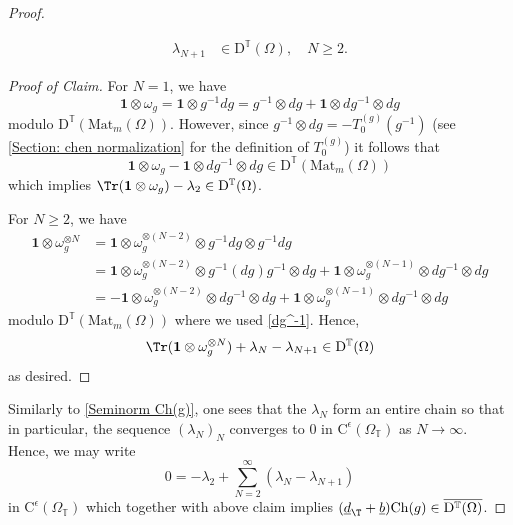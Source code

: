 \documentclass[a4paper, english, 12pt, bibliography=totocnumbered,
index=totoc]{scrartcl}
\begin{document}
\begin{proof}
\begin{claim}
\begin{align*}
			\lambda_{N+1} & \in
			\mathrm{D}^{\mathbb{T}}(\Omega), \quad N \geq 2.
		\end{align*}
	\end{claim}
	\begin{proof}[Proof of Claim]
		For $N = 1$, we have
		\begin{equation*}
			\mathbf{1} \otimes \omega_g = \mathbf{1} \otimes g^{-1}dg =
			g^{-1} \otimes dg + \mathbf{1} \otimes dg^{-1} \otimes dg
		\end{equation*}
		modulo $\mathrm{D}^{\mathbb{T}}(\mathrm{Mat}_m(\Omega))$.
		However, since $g^{-1} \otimes dg = -T_0^{(g)}(g^{-1})$ (see
		\cref{Section: chen normalization} for the definition of $T_0^{(g)}$)
		it follows that
		\begin{equation*}
			\mathbf{1} \otimes \omega_g - \mathbf{1} \otimes dg^{-1} \otimes
			dg \in \mathrm{D}^{\mathbb{T}}(\mathrm{Mat}_m(\Omega))
		\end{equation*}
		which implies $\Tr(\mathbf{1} \otimes \omega_g) - \lambda_2 \in
		\mathrm{D}^{\mathbb{T}}(\Omega)$.

		For $N \geq 2$, we have
		\begin{align*}
			\mathbf{1} \otimes \omega_g^{\otimes N} & = \mathbf{1} \otimes
			\omega_g^{\otimes (N-2)} \otimes g^{-1}dg \otimes g^{-1} dg \\
			& = \mathbf{1} \otimes \omega_g^{\otimes (N-2)} \otimes
			g^{-1}(dg)g^{-1} \otimes dg + \mathbf{1} \otimes
			\omega_g^{\otimes(N-1)} \otimes dg^{-1} \otimes dg \\
			& = -\mathbf{1} \otimes
			\omega_g^{\otimes (N-2)} \otimes dg^{-1} \otimes dg + \mathbf{1}
			\otimes \omega_g^{\otimes(N-1)} \otimes dg^{-1} \otimes dg
		\end{align*}
		modulo $\mathrm{D}^{\mathbb{T}}(\mathrm{Mat}_m(\Omega))$ where we
		used \cref{dg^-1}.
		Hence,
		\begin{equation*}
			\Tr(\mathbf{1} \otimes \omega_g^{\otimes N}) + \lambda_N -
			\lambda_{N+1} \in
			\mathrm{D}^{\mathbb{T}}(\Omega)
		\end{equation*}
		as desired.
	\end{proof}
	Similarly to \cref{Seminorm Ch(g)}, one sees that the $\lambda_N$ form an
	entire chain so that in particular, the sequence $(\lambda_N)_N$
	converges to $0$ in
	$\mathrm{C}^\epsilon(\Omega_{\mathbb{T}})$ as $N \to \infty$.
	Hence, we may write
	\begin{equation*}
		0 = - \lambda_2 + \sum_{N = 2}^\infty (\lambda_N - \lambda_{N+1})
	\end{equation*}
	in $\mathrm{C}^\epsilon(\Omega_{\mathbb{T}})$ which together with above
	claim implies $(\underline{d}_\T +
	\underline{b})\mathrm{Ch}(g) \in
	\overline{\mathrm{D}^{\mathbb{T}}(\Omega)}$.
\end{proof}
\end{document}
